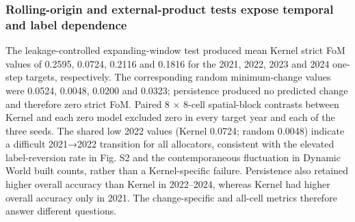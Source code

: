 \subsubsection{Rolling-origin and external-product tests expose temporal
and label
dependence}\label{rolling-origin-and-external-product-tests-expose-temporal-and-label-dependence}

The leakage-controlled expanding-window test produced mean Kernel strict
FoM values of 0.2595, 0.0724, 0.2116 and 0.1816 for the 2021, 2022, 2023
and 2024 one-step targets, respectively. The corresponding random
minimum-change values were 0.0524, 0.0048, 0.0200 and 0.0323;
persistence produced no predicted change and therefore zero strict FoM.
Paired 8 × 8-cell spatial-block contrasts between Kernel and each zero
model excluded zero in every target year and each of the three seeds.
The shared low 2022 values (Kernel 0.0724; random 0.0048) indicate a
difficult 2021→2022 transition for all allocators, consistent with the
elevated label-reversion rate in Fig. S2 and the contemporaneous
fluctuation in Dynamic World built counts, rather than a Kernel-specific
failure. Persistence also retained higher overall accuracy than Kernel
in 2022--2024, whereas Kernel had higher overall accuracy only in 2021.
The change-specific and all-cell metrics therefore answer different
questions.

